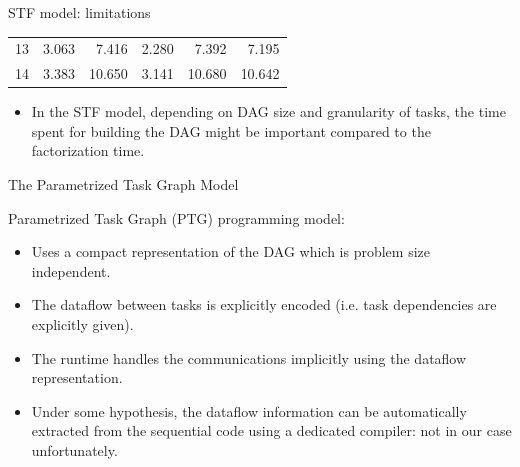 \documentclass{beamer}
\newcommand{\db}[1]{\textcolor{mblue}{#1\xspace}}
\newcommand{\dd}[1]{\textcolor{gray!70}{#1\xspace}}
\begin{document}
\begin{frame}{STF model: limitations}
\begin{center}
{{\begin{tabular}{r|rr|rr|r}
        13 & \dd{3.063}                 & \dd{7.416}                 & \dd{2.280} & \dd{7.392}  & \dd{7.195}  \\
        14 & \dd{3.383}                 & \dd{10.650}                & \dd{3.141} & \dd{10.680} & \dd{10.642} \\
        \hline
    \end{tabular}}}  
  \end{center}
  \begin{itemize}
  \item In the STF model, depending on \alert{DAG size} and
    \alert{granularity} of tasks, the time spent for building the DAG
    might be important compared to the factorization time.
  \end{itemize}
\end{frame}

\begin{frame}{The Parametrized Task Graph Model}
  
  \alert{Parametrized Task Graph} (PTG) programming model:

  \begin{itemize}
  \item Uses a \db{compact representation} of the DAG which is problem
    size independent.
  \item The dataflow between tasks is \db{explicitly} encoded
    (i.e. task dependencies are explicitly given).
  \item The runtime handles the communications implicitly using the
    dataflow representation.
  \item Under some hypothesis, the dataflow information can be
    \db{automatically} extracted from the sequential code using a dedicated
    compiler: \alert{not in our case} unfortunately.
  \end{itemize}

\end{frame}
\end{document}
